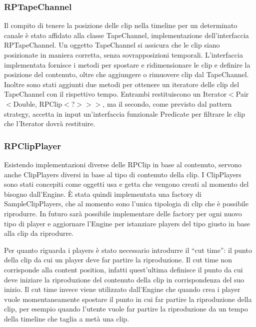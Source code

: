 \documentclass[a4paper,12pt]{report}
\begin{document}
\subsubsection{RPTapeChannel}
Il compito di tenere la posizione delle clip nella timeline per un determinato canale è stato affidato alla classe TapeChannel, implementazione dell’interfaccia RPTapeChannel. Un oggetto TapeChannel si assicura che le clip siano posizionate in maniera corretta, senza sovrapposizioni temporali.
L’interfaccia implementata fornisce i metodi per spostare e ridimensionare le clip e definire la posizione del contenuto, oltre che aggiungere o rimuovere clip dal TapeChannel.
Inoltre sono stati aggiunti due metodi per ottenere un iteratore delle clip del TapeChannel con il rispettivo tempo. Entrambi restituiscono un Iterator\begin{math}<\end{math}Pair\begin{math}<\end{math}Double, RPClip\begin{math}<\end{math}?\begin{math}>>>\end{math}, ma il secondo, come previsto dal pattern strategy, accetta in input un'interfaccia funzionale Predicate per filtrare le clip che l’Iterator dovrà restituire.
\endsubsubsection
\subsubsection{RPClipPlayer}
Esistendo implementazioni diverse delle RPClip in base al contenuto, servono anche ClipPlayers diversi in base al tipo di contenuto della clip.
I ClipPlayers sono stati concepiti come oggetti usa e getta che vengono creati al momento del bisogno dall’Engine. È stata quindi implementata una factory di SampleClipPlayers, che al momento sono l’unica tipologia di clip che è possibile riprodurre. In futuro sarà possibile implementare delle factory per ogni nuovo tipo di player e aggiornare l’Engine per istanziare players del tipo giusto in base alla clip da riprodurre.

Per quanto riguarda i players è stato necessario introdurre il “cut time”:
il punto della clip da cui un player deve far partire la riproduzione.
Il cut time non corrisponde alla content position, infatti quest’ultima definisce il punto da cui deve iniziare la riproduzione del contenuto della clip in corrispondenza del suo inizio. Il cut time invece viene utilizzato dall’Engine che quando crea i player vuole momentaneamente spostare il punto in cui far partire la riproduzione della clip, per esempio quando l’utente vuole far partire la riproduzione da un tempo della timeline che taglia a metà una clip.
\end{document}
